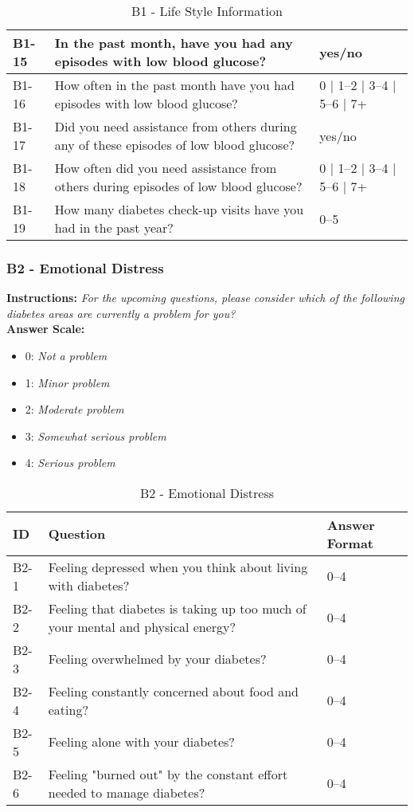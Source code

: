 \begin{table}[H]
\begin{tabularx}{\textwidth}{|l|X|l|}
        B1-15 & In the past month, have you had any episodes with low blood glucose? & yes/no \\ \hline
        B1-16 & How often in the past month have you had episodes with low blood glucose? & 0 $\mid$ 1--2 $\mid$ 3--4 $\mid$ 5--6 $\mid$ 7+ \\ \hline
        B1-17 & Did you need assistance from others during any of these episodes of low blood glucose? & yes/no \\ \hline
        B1-18 & How often did you need assistance from others during episodes of low blood glucose? & 0 $\mid$ 1--2 $\mid$ 3--4 $\mid$ 5--6 $\mid$ 7+ \\ \hline
        B1-19 & How many diabetes check-up visits have you had in the past year? & 0--5 \\ \hline
    \end{tabularx}
    \caption{B1 - Life Style Information}
    \label{tab:Life-Style-Information}
\end{table}


\subsubsection{B2 - Emotional Distress}\label{sec:B2-emotional-distress}
\textbf{Instructions:} \emph{For the upcoming questions, please consider which of the following diabetes areas are currently a problem for you?}
\\
\textbf{Answer Scale:}
\begin{itemize}
    \item 0: \emph{Not a problem}
    \item 1: \emph{Minor problem}
    \item 2: \emph{Moderate problem}
    \item 3: \emph{Somewhat serious problem}
    \item 4: \emph{Serious problem}
\end{itemize}
\begin{table}[H]
    \centering
    \renewcommand{\arraystretch}{1.2}
    \begin{tabularx}{\textwidth}{|l|X|l|}
        \hline
        \textbf{ID} & \textbf{Question} & \textbf{Answer Format} \\ \hline
        B2-1 & Feeling depressed when you think about living with diabetes? & 0--4 \\ \hline
        B2-2 & Feeling that diabetes is taking up too much of your mental and physical energy? & 0--4 \\ \hline
        B2-3 & Feeling overwhelmed by your diabetes? & 0--4 \\ \hline
        B2-4 & Feeling constantly concerned about food and eating? & 0--4 \\ \hline
        B2-5 & Feeling alone with your diabetes? & 0--4 \\ \hline
        B2-6 & Feeling "burned out" by the constant effort needed to manage diabetes? & 0--4 \\ \hline
    \end{tabularx}
    \caption{B2 - Emotional Distress}
    \label{tab:emotional-distress}
\end{table}


